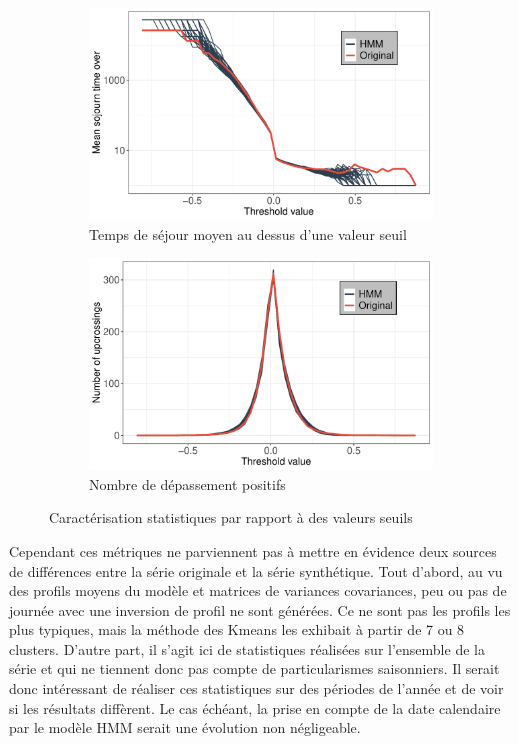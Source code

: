 \documentclass[12pt]{report}
\begin{document}
\begin{figure}[htbp] 
	\begin{subfigure}[b]{0.5\linewidth}
		\centering
		\includegraphics[width = 0.95 \linewidth]{Images/PV/HMM/Stats/MDO.pdf}
		\caption{Temps de séjour moyen au dessus d'une valeur seuil}
		\label{fig:PV_HMM_Stat_MDO}
	\end{subfigure}%
	\begin{subfigure}[b]{0.5\linewidth}
		\centering
		\includegraphics[width = 0.95 \linewidth]{Images/PV/HMM/Stats/NU.pdf}
		\caption{Nombre de dépassement positifs}
		\label{fig:PV_HMM_Stat_NU}
	\end{subfigure}
	
	\caption{Caractérisation statistiques par rapport à des valeurs seuils}
	\label{fig:PV_HMM_Stat_MDONU} 
\end{figure}

Cependant ces métriques ne parviennent pas à mettre en évidence deux sources de différences entre la série originale et la série synthétique. Tout d'abord, au vu des profils moyens du modèle et matrices de variances covariances, peu ou pas de journée avec une inversion de profil ne sont générées. Ce ne sont pas les profils les plus typiques, mais la méthode des Kmeans les exhibait à partir de 7 ou 8 clusters. D'autre part, il s'agit ici de statistiques réalisées sur l'ensemble de la série et qui ne tiennent donc pas compte de particularismes saisonniers. Il serait donc intéressant de réaliser ces statistiques sur des périodes de l'année et de voir si les résultats diffèrent. Le cas échéant, la prise en compte de la date calendaire par le modèle HMM serait une évolution non négligeable.
\end{document}
